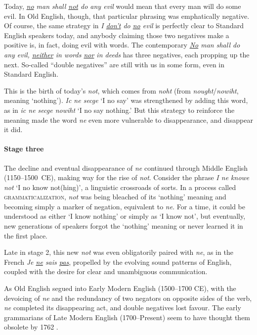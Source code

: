 Today, \textit{\uline{no} man shall \uline{not} do any evil} would mean that every man will do some evil. In Old English, though, that particular phrasing was emphatically negative. Of course, the same strategy in \textit{I \uline{don't} do \uline{no} evil} is perfectly clear to Standard English speakers today, and anybody claiming those two negatives make a positive is, in fact, doing evil with words. The contemporary \textit{\uline{No} man shall do any evil, \uline{neither} in words \uline{nor} in deeds} has three negatives, each propping up the next. So-called ``double negatives'' are still with us in some form, even in Standard English.

This is the birth of today's \textit{not}, which comes from \textit{noht} (from \textit{nought}/\textit{nowiht}, meaning `nothing').  \textit{Ic ne secge} `I no say' was strengthened by adding this word, as in \textit{ic ne secge nowiht} `I no say nothing.' But this  strategy to reinforce the meaning made the word \textit{ne} even more vulnerable to disappearance, and disappear it did. 

\paragraph*{Stage three}

The decline and eventual disappearance of \textit{ne} continued through Middle English (1150--1500~CE), making way for the rise of \textit{not}. Consider the phrase \textit{I ne knowe not} `I no know not(hing)', a linguistic crossroads of sorts. In a process called \textsc{grammaticalization}, \textit{not} was being bleached of its `nothing' meaning and becoming simply a marker of negation, equivalent to \textit{ne}. For a time, it could be understood as either `I know nothing' or simply as `I know not', but eventually, new generations of speakers forgot the `nothing' meaning or never learned it in the first place.

Late in stage 2, this new \textit{not} was even obligatorily paired with \textit{ne}, as in the French \textit{Je \uline{ne} sais \uline{pas}}, propelled by the evolving sound patterns of English, coupled with the desire for clear and unambiguous communication.

As Old English segued into Early Modern English (1500--1700 CE), with the devoicing of \textit{ne} and the redundancy of two negators on opposite sides of the verb, \textit{ne} completed its disappearing act, and double negatives lost favour. The early grammarians of Late Modern English (1700--Present) seem to have thought them obsolete by 1762 \citep[365]{Gilman1989}.

